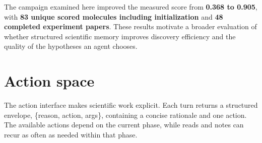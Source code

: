 \documentclass[11pt,a4paper]{article}
\begin{document}
\begin{center}
\end{center}
The campaign examined here improved the measured score from \textbf{0.368 to 0.905}, with \textbf{83 unique scored molecules including initialization} and \textbf{48 completed experiment papers}. These results motivate a broader evaluation of whether structured scientific memory improves discovery efficiency and the quality of the hypotheses an agent chooses.

\newpage
\section{Action space}
The action interface makes scientific work explicit. Each turn returns a structured envelope, \textsf{\{reason, action, args\}}, containing a concise rationale and one action. The available actions depend on the current phase, while reads and notes can recur as often as needed within that phase.
\end{document}
